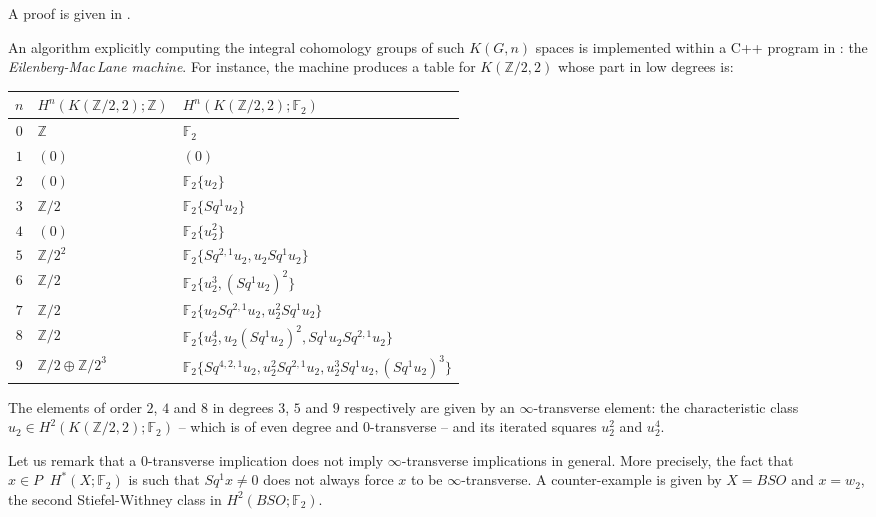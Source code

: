 \documentclass{conm-p-l}
\theoremstyle{definition}
\DeclareMathOperator{\even}{^{even}}
\newcommand{\Z}{\mathbb{Z}}
\newcommand{\F}{\mathbb{F}}
\begin{document}
A proof is given in \cite[Theorem 1.3.2]{Cl02-PhD}.

An algorithm explicitly computing the integral cohomology groups of such $K(G,n)$ spaces is implemented within a C++ program in \cite{Cl02-EMM}: the {\it Eilenberg-Mac\,Lane machine}. For instance, the machine produces a table for $K(\Z/2,2)$ whose part in low degrees is: 

\medskip
\begin{tabular}{|c|p{3cm}|p{8cm}|}
\hline
$n$ &$H^n(K(\Z/2,2);\Z)$ &$H^n(K(\Z/2,2);\F_2)$ \\
\hline

$0$%
&$\Z$
&$\F_2$\\

$1$%
&$(0)$%
&$(0)$\\

$2$%
&$(0)$%
&$\F_2\{u_2\}$\\

$3$%
&$\Z/2$%
&$\F_2\{Sq^1u_2\}$\\

$4$%
&$(0)$%
&$\F_2\{u_2^2\}$\\

$5$%
&$\Z/2^{2}$%
&$\F_2\{Sq^{2,1}u_2,u_2Sq^1u_2\}$\\

$6$%
&$\Z/2$%
&$\F_2\{u_2^3,(Sq^1u_2)^2\}$\\

$7$%
&$\Z/2$%
&$\F_2\{u_2Sq^{2,1}u_2,u_2^2Sq^1u_2\}$\\

$8$%
&$\Z/2$%
&$\F_2\{u_2^4,u_2(Sq^1u_2)^2,Sq^1u_2Sq^{2,1}u_2\}$\\

$9$%
&$\Z/2\oplus\Z/2^{3}$%
&$\F_2\{Sq^{4,2,1}u_2,u_2^2Sq^{2,1}u_2,u_2^3Sq^1u_2,(Sq^1u_2)^3\}$\\

\hline
\end{tabular}
\medskip

The elements of order $2$, $4$ and $8$ in degrees $3$, $5$ and $9$ respectively are given by an $\infty$-transverse element: the characteristic class $u_2\in H^2(K(\Z/2,2);\F_2)$ -- which is of even degree and $0$-transverse -- and its iterated squares $u_2^2$ and $u_2^4$.

Let us remark that a $0$-transverse implication does not imply $\infty$-transverse implications in general. More precisely, the fact that $x\in P\even H^*(X;\F_2)$ is such that $Sq^1x\not=0$ does not always force $x$ to be $\infty$-transverse. A counter-example is given by $X=BSO$ and $x=w_2$, the second Stiefel-Withney class in $H^2(BSO;\F_2)$.
\end{document}
